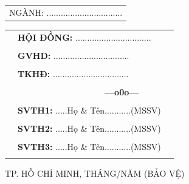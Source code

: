 \documentclass[a4paper]{article}
\theoremstyle{definition}
\begin{document}
\begin{titlepage}
\begin{center}
\begin{tabular}{c}
\\ \vspace{0.5cm} {\Large NGÀNH: ................................}
\end{tabular}
\end{center}
\vspace{0.5cm}
\begin{table}[h]
\begin{tabular}{rll}
\hspace{6 cm} &  \textbf{\Large HỘI ĐỒNG:} {\Large ................................}
\\
\\
\hspace{6 cm} &   \textbf{\Large GVHD:} {\Large ................................}
\\
\\
\hspace{6 cm}  &   \textbf{\Large TKHĐ:} {\Large ................................}
\\
\\
\hspace{6 cm} &     \textbf{$\;$ $\;$$\;$$\;$$\;$$\;$$\;$$\;$$\;$$\;$$\;$$\;$$\;$$\;$$\;$$\;$$\;$$\;$$\;$$\;$$\;$$\;$$\;$$\;$$\;$$\;$$\;$$\;$$\;$$\;$$\;$$\;$$\;$$\;$ \Large ---o0o---} 
\\
\\
\hspace{6 cm} &   \textbf{\Large SVTH1:} {\Large .....Họ \& Tên...........(MSSV)}
\\
\\
\hspace{6 cm}&   \textbf{\Large SVTH2:}  {\Large .....Họ \& Tên...........(MSSV)}
\\
\\
\hspace{6 cm} &   \textbf{\Large SVTH3:}  {\Large .....Họ \& Tên...........(MSSV)}
\\
\\
\end{tabular}
\end{table}
\vspace{0.5cm}
\begin{center}
{\Large TP. HỒ CHÍ MINH, THÁNG/NĂM (BẢO VỆ) }
\end{center}
\end{titlepage}
\newpage



\newpage
\tableofcontents
\newpage
\listoffigures
\newpage
\listoftables
\newpage
\setcounter{page}{1}


\newpage

\newpage

\newpage

\newpage

\newpage


\newpage

\end{document}
